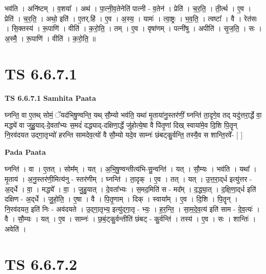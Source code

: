 \documentclass[17pt]{extarticle}
\begin{document}
भव॑ति । अनि॑ष्टम् । व॒शया᳚ । अथ॑ । पा॒त्नी॒व॒तेनेति॑ पात्नी - व॒तेन॑ । प्रेति॑ । च॒र॒ति॒ । ती॒र्त्थ । ए॒व । प्रेति॑ । च॒र॒ति॒ । अथो॒ इति॑ । ए॒तर्.हि॑ । ए॒व । अ॒स्य॒ । यामः॑ । त्वा॒ष्ट्रः । भ॒व॒ति॒ । त्वष्टा᳚ । वै । रेत॑सः । सि॒क्तस्य॑ । रू॒पाणि॑ । वीति॑ । क॒रो॒ति॒ । तम् । ए॒व । वृषा॑णम् । पत्नी॑षु । अपीति॑ । सृ॒ज॒ति॒ । सः । अ॒स्मै॒ । रू॒पाणि॑ । वीति॑ । क॒रो॒ति॒ ॥  \newline





\section{ TS 6.6.7.1 }

\textbf{TS 6.6.7.1 } \newline
\textbf{Samhita Paata} \newline

घ्नन्ति॒ वा ए॒तथ् सोमं॒ ॅयद॑भिषु॒ण्वन्ति॒ यथ् सौ॒म्यो भव॑ति॒ यथा॑ मृ॒ताया॑नु॒स्तर॑णीं॒ घ्नन्ति॑ ता॒दृगे॒व तद् यदु॑त्तरा॒र्द्धे वा॒ मद्ध्ये॑ वा जुहु॒याद्-दे॒वता᳚भ्यः स॒मदं॑ दद्ध्याद्-दक्षिणा॒र्द्धे जु॑होत्ये॒षा वै पि॑तृ॒णां दिख् स्वाया॑मे॒व दि॒शि पि॒तॄन् नि॒रव॑दयत उद्गा॒तृभ्यो॑ हरन्ति सामदेव॒त्यो॑ वै सौ॒म्यो यदे॒व साम्नः॑ छंबट्कु॒र्वन्ति॒ तस्यै॒व स शान्ति॒रवे᳚- [  ] \newline

\textbf{Pada Paata} \newline

घ्नन्ति॑ । वा । ए॒तत् । सोम᳚म् । यत् । अ॒भि॒षु॒ण्वन्तीत्य॑भि-सु॒न्वन्ति॑ । यत् । सौ॒म्यः । भव॑ति । यथा᳚ । मृ॒ताय॑ । अ॒नु॒स्तर॑णी॒मित्य॑नु - स्तर॑णीम् । घ्नन्ति॑ । ता॒दृक् । ए॒व । तत् । यत् । उ॒त्त॒रा॒द्‌र्ध इत्यु॑त्तर - अ॒द्‌र्धे । वा॒ । मद्ध्ये᳚ । वा॒ । जु॒हु॒यात् । दे॒वता᳚भ्यः । स॒मद॒मिति॑ स - मद᳚म् । द॒द्ध्या॒त् । द॒क्षि॒णा॒द्‌र्ध इति॑ दक्षिण - अ॒द्‌र्धे । जु॒हो॒ति॒ । ए॒षा । वै । पि॒तृ॒णाम् । दिक् । स्वाया᳚म् । ए॒व । दि॒शि । पि॒तॄन् । नि॒रव॑दयत॒ इति॑ निः - अव॑दयते । उ॒द्गा॒तृभ्य॒ इत्यु॑द्गा॒तृ - भ्यः॒ । ह॒र॒न्ति॒ । सा॒म॒दे॒व॒त्य॑ इति॑ साम - दे॒व॒त्यः॑ । वै । सौ॒म्यः । यत् । ए॒व । साम्नः॑ । छ॒बं॒ट्कु॒र्वन्तीति॑ छंबट् - कु॒र्वन्ति॑ । तस्य॑ । ए॒व । सः । शान्तिः॑ । अवेति॑ ।  \newline





\section{ TS 6.6.7.2 }
\end{document}
